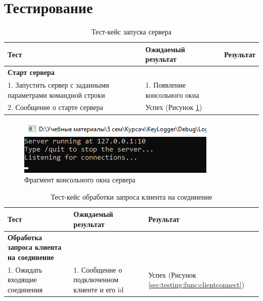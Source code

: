 \section{Тестирование}
\label{sec:testing}



\begin{table}[ht]
	\caption{Тест-кейс запуска сервера}
	\label{table:testing:func:test1}
	\centering
	  \begin{tabular}{| >{\raggedright}m{} 
					  | >{\raggedright}m{} 
					  | >{\raggedright\arraybackslash}m{}|}
	  \hline Тест & Ожидаемый результат  & Результат \\
	  \hline \textbf{Старт сервера} \\ 1. Запустить сервер с заданными параметрами командной строки & 1. Появление консольного окна \\ 2. Сообщение о старте сервера & Успех (Рисунок \ref*{sec:testing:func:start})\\
	  \hline
	  \end{tabular}
\end{table}

\begin{figure}[ht]
	\centering
	  \includegraphics[scale=1]{attachments/serverstart.png}  
	  \caption{ Фрагмент консольного окна сервера }
	  \label{sec:testing:func:start}
\end{figure}

\begin{table}[ht]
	\caption{Тест-кейс обработки запроса клиента на соединение}
	\label{table:testing:func:test2}
	\centering
	  \begin{tabular}{| >{\raggedright}m{0.4\textwidth} 
					  | >{\raggedright}m{0.3\textwidth} 
					  | >{\raggedright\arraybackslash}m{}|}
	  \hline Тест & Ожидаемый результат  & Результат \\
	  \hline \textbf{Обработка запроса клиента на соединение} \\ 1. Ожидать входящие соединения & 1. Сообщение о подключенном клиенте и его id & Успех (Рисунок \ref*{sec:testing:func:clientconnect})\\
	  \hline
	  \end{tabular}
\end{table}

